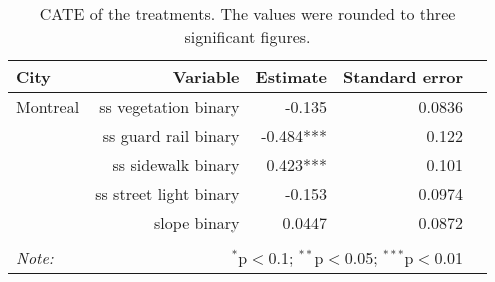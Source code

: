 \begin{table}[!htp]\centering
\caption{CATE of the treatments. The values were rounded to three significant figures.}\label{result:tab:cf}
\scriptsize
\begin{tabular}{lrrrr}\toprule
City&Variable&Estimate &Standard error \\ \midrule
Montreal & ss vegetation binary & -0.135 & 0.0836 \\
 & ss guard rail binary & -0.484*** & 0.122 \\
 & ss sidewalk binary & 0.423*** & 0.101 \\
 & ss street light binary & -0.153 & 0.0974 \\
 & slope binary & 0.0447 & 0.0872 \\
\hline
\hline \\[-1.8ex]
\textit{Note:}  & \multicolumn{3}{r}{$^{*}$p$<$0.1; $^{**}$p$<$0.05; $^{***}$p$<$0.01} \\
\end{tabular}
\end{table}
